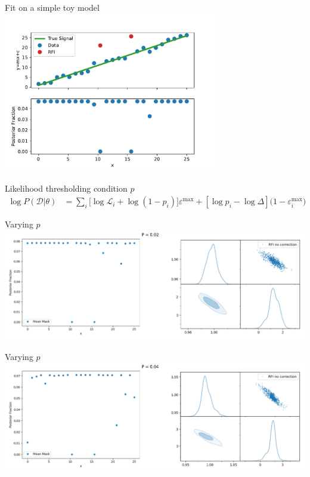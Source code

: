 \documentclass[aspectratio=169]{beamer}
\begin{document}
\begin{frame}{Fit on a simple toy model}
    \centering
    \includegraphics[width=0.7\textwidth]{images/test.pdf}
  \end{frame}

\begin{frame}{Likelihood thresholding condition $p$}
    \begin{equation}
    \begin{aligned}
    \log{P(\mathcal{D}|\theta)} &= \sum_{i}[{\log{\mathcal{L}_i}+\log({1-p_i})]\varepsilon^{\mathrm{max}} + [\log{p}_i - \log{\Delta}](1 - \varepsilon^\mathrm{max}_i})\label{eq:loglikelihood}
    \end{aligned}
    \end{equation}
    \centering
\end{frame}

\begin{frame}{Varying $p$}
    \centering
    \includegraphics[width=\textwidth]{images/gif_anest/comb_2.png}
\end{frame}

\begin{frame}{Varying $p$}
    \centering
    \includegraphics[width=\textwidth]{images/gif_anest/comb_3.png}
\end{frame}
\end{document}
